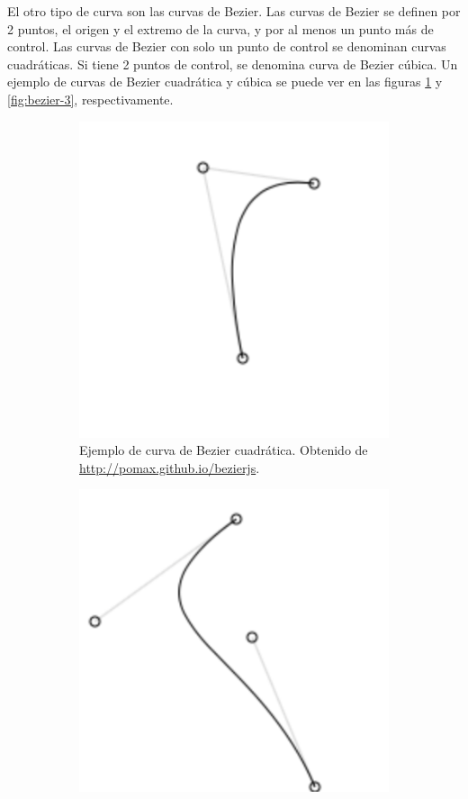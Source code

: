 El otro tipo de curva son las curvas de Bezier\cite{bezier-info}. Las curvas de Bezier se definen por 2 puntos, el origen y el extremo de la curva, y por al menos un punto más de control. Las curvas de Bezier con solo un punto de control se denominan curvas cuadráticas. Si tiene 2 puntos de control, se denomina curva de Bezier cúbica. Un ejemplo de curvas de Bezier cuadrática y cúbica se puede ver en las figuras \ref{fig:bezier-2} y \ref{fig:bezier-3}, respectivamente.


\begin{figure}[!ht]
	\begin{adjustwidth}{\oddsidemargin-1in}{\rightmargin}
			\begin{subfigure}{\paperwidth}
				\centering
				\includegraphics[scale=.5]{images/bezier-2.png}
	\caption{Ejemplo de curva de Bezier cuadrática. Obtenido de \url{http://pomax.github.io/bezierjs}.}				
				\label{fig:bezier-2}
			\end{subfigure}
			\begin{subfigure}{\paperwidth}
				\centering
				\includegraphics[scale=.5]{images/bezier-3.png}

\end{subfigure}
\end{adjustwidth}
\end{figure}
